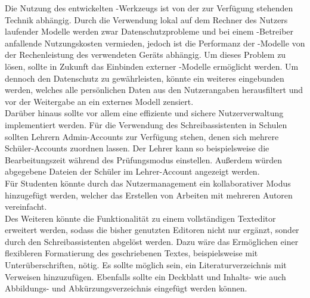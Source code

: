 \documentclass[../main.tex]{subfiles}
\begin{document}
Die Nutzung des entwickelten -Werkzeugs ist von der zur Verfügung stehenden Technik abhängig. Durch die Verwendung lokal auf dem Rechner des Nutzers laufender Modelle werden zwar 
Datenschutzprobleme und bei einem -Betreiber anfallende Nutzungskosten vermieden, jedoch ist die Performanz der -Modelle von der Rechenleistung des verwendeten Geräts abhängig. 
Um dieses Problem zu lösen, sollte in Zukunft das Einbinden externer -Modelle ermöglicht werden. Um dennoch den Datenschutz zu gewährleisten, könnte ein weiteres 
eingebunden werden, welches alle persönlichen Daten aus den Nutzerangaben herausfiltert und vor der Weitergabe an ein externes Modell zensiert.\\ 
Darüber hinaus sollte vor allem eine effiziente und sichere Nutzerverwaltung implementiert werden. Für die Verwendung des Schreibassistenten in Schulen sollten Lehrern Admin-Accounts 
zur Verfügung stehen, denen sich mehrere Schüler-Accounts zuordnen lassen. Der Lehrer kann so beispielsweise die Bearbeitungszeit während des Prüfungsmodus einstellen. Außerdem 
würden abgegebene Dateien der Schüler im Lehrer-Account angezeigt werden.\\
Für Studenten könnte durch das Nutzermanagement ein kollaborativer Modus hinzugefügt werden, welcher das Erstellen von Arbeiten mit mehreren Autoren vereinfacht. \\
Des Weiteren könnte die Funktionalität zu einem vollständigen Texteditor erweitert werden, sodass die bisher genutzten Editoren nicht nur ergänzt, sonder durch den Schreibassistenten 
abgelöst werden. Dazu wäre das Ermöglichen einer flexibleren Formatierung des geschriebenen Textes, beispielsweise mit Unterüberschriften, nötig. Es sollte möglich sein, ein 
Literaturverzeichnis mit Verweisen hinzuzufügen. Ebenfalls sollte ein Deckblatt und Inhalts- wie auch Abbildungs- und Abkürzungsverzeichnis eingefügt werden können.
\end{document}
